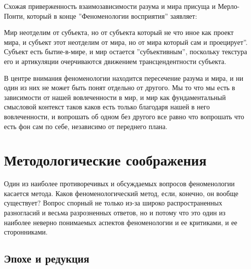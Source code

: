 \documentclass[11pt]{book}
\begin{document}
\relax
{}\relax
\smallskip

Схожая приверженность взаимозависимости разума и мира присуща и Мерло-Понти, который в конце ''Феноменологии восприятия'' заявляет:

\smallskip
{}\relax
{}\relax

Мир неотделим от субъекта, но от субъекта который не что иное как проект мира, и субъект этот неотделим от мира, но от мира который сам и проецирует''. Субъект есть бытие-в-мире, и мир остается ''субъективным'', поскольку текстура его и артикуляции очерчиваются движением трансцендентности субъекта.

\relax
{}\relax
\smallskip

В центре внимания феноменологии находится пересечение разума и мира, и ни один из них не может быть понят отдельно от другого. Мы то что мы есть в зависимости от нашей вовлеченности в мир, и мир как фундаментальный смысловой контекст таков каков есть только благодаря нашей в него вовлеченности, и вопрошать об одном без другого все равно что вопрошать что есть фон сам по себе, независимо от переднего плана.

\chapter{Методологические соображения}

Один из наиболее противоречивых и обсуждаемых вопросов феноменологии касается метода. Каков феноменологический метод, если, конечно, он вообще существует? Вопрос спорный не только из-за широко распространенных разногласий и весьма разрозненных ответов, но и потому что это один из наиболее неверно понимаемых аспектов феноменологии и ее критиками, и ее сторонниками.

\section{Эпохе и редукция}
\end{document}
